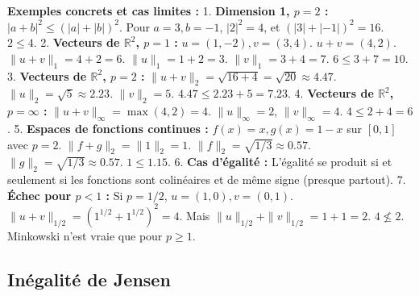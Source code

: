 \documentclass[11pt,a4paper]{article}
\begin{document}
\textbf{Exemples concrets et cas limites :}
1. \textbf{Dimension 1, $p=2$ :} $|a+b|^2 \le (|a|+|b|)^2$. Pour $a=3, b=-1$, $|2|^2 = 4$, et $(|3|+|-1|)^2 = 16$. $2 \le 4$.
2. \textbf{Vecteurs de $\mathbb{R}^2$, $p=1$ :} $u = (1, -2), v = (3, 4)$. $u+v = (4, 2)$. $\|u+v\|_1 = 4+2=6$. $\|u\|_1 = 1+2=3$. $\|v\|_1 = 3+4=7$. $6 \le 3+7 = 10$.
3. \textbf{Vecteurs de $\mathbb{R}^2$, $p=2$ :} $\|u+v\|_2 = \sqrt{16+4} = \sqrt{20} \approx 4.47$. $\|u\|_2 = \sqrt{5} \approx 2.23$. $\|v\|_2 = 5$. $4.47 \le 2.23 + 5 = 7.23$.
4. \textbf{Vecteurs de $\mathbb{R}^2$, $p=\infty$ :} $\|u+v\|_\infty = \max(4, 2) = 4$. $\|u\|_\infty = 2$, $\|v\|_\infty = 4$. $4 \le 2+4=6$.
5. \textbf{Espaces de fonctions continues :} $f(x)=x, g(x)=1-x$ sur $[0,1]$ avec $p=2$. $\|f+g\|_2 = \|1\|_2 = 1$. $\|f\|_2 = \sqrt{1/3} \approx 0.57$. $\|g\|_2 = \sqrt{1/3} \approx 0.57$. $1 \le 1.15$.
6. \textbf{Cas d'égalité :} L'égalité se produit si et seulement si les fonctions sont colinéaires et de même signe (presque partout).
7. \textbf{Échec pour $p < 1$ :} Si $p=1/2$, $u=(1,0), v=(0,1)$. $\|u+v\|_{1/2} = (1^{1/2} + 1^{1/2})^2 = 4$. Mais $\|u\|_{1/2} + \|v\|_{1/2} = 1 + 1 = 2$. $4 \not\le 2$. Minkowski n'est vraie que pour $p \ge 1$.

\subsection*{Inégalité de Jensen}
\end{document}
